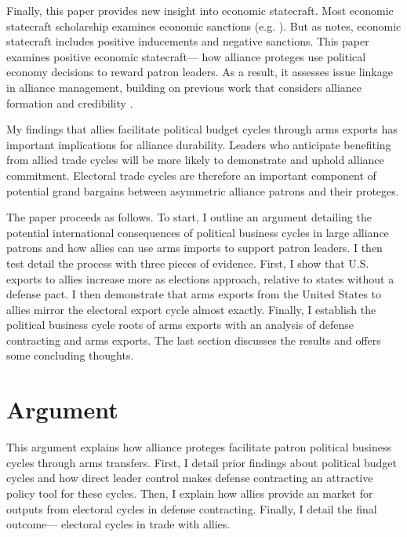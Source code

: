 \documentclass[12pt]{article}
\begin{document}
Finally, this paper provides new insight into economic statecraft. 
Most economic statecraft scholarship examines economic sanctions (e.g. \citep{Marinov2005, Allen2008, Escriba-FolchWright2010}).
But as \citep{Baldwin2020} notes, economic statecraft includes positive inducements and negative sanctions. 
This paper examines positive economic statecraft--- how alliance proteges use political economy decisions to reward patron leaders.
As a result, it assesses issue linkage in alliance management, building on previous work that considers alliance formation \citep{Poast2012} and credibility \citep{Davis2008, Poast2013}. 


My findings that allies facilitate political budget cycles through arms exports has important implications for alliance durability. 
Leaders who anticipate benefiting from allied trade cycles will be more likely to demonstrate and uphold alliance commitment. 
Electoral trade cycles are therefore an important component of potential grand bargains between asymmetric alliance patrons and their proteges. 


The paper proceeds as follows. 
To start, I outline an argument detailing the potential international consequences of political business cycles in large alliance patrons and how allies can use arms imports to support patron leaders. 
I then test detail the process with three pieces of evidence. 
First, I show that U.S. exports to allies increase more as elections approach, relative to states without a defense pact. 
I then demonstrate that arms exports from the United States to allies mirror the electoral export cycle almost exactly.
Finally, I establish the political business cycle roots of arms exports with an analysis of defense contracting and arms exports.
The last section discusses the results and offers some concluding thoughts.


\section{Argument}


This argument explains how alliance proteges facilitate patron political business cycles through arms transfers. 
First, I detail prior findings about political budget cycles and how direct leader control makes defense contracting an attractive policy tool for these cycles. 
Then, I explain how allies provide an market for outputs from electoral cycles in defense contracting. 
Finally, I detail the final outcome--- electoral cycles in trade with allies. 
\end{document}
